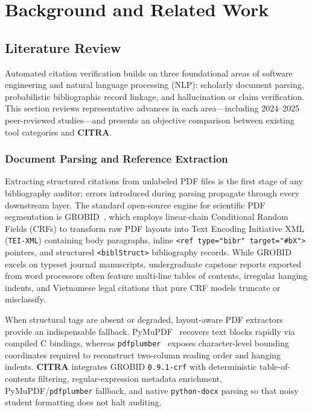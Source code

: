 \chapter{Background and Related Work}
\label{chap:background}

\section{Literature Review}

Automated citation verification builds on three foundational areas of software engineering and natural language processing (NLP): scholarly document parsing, probabilistic bibliographic record linkage, and hallucination or claim verification. This section reviews representative advances in each area---including 2024--2025 peer-reviewed studies---and presents an objective comparison between existing tool categories and \textbf{CITRA}.

\subsection{Document Parsing and Reference Extraction}

Extracting structured citations from unlabeled PDF files is the first stage of any bibliography auditor; errors introduced during parsing propagate through every downstream layer. The standard open-source engine for scientific PDF segmentation is GROBID~\cite{Lopez2009}, which employs linear-chain Conditional Random Fields (CRFs) to transform raw PDF layouts into Text Encoding Initiative XML (\texttt{TEI-XML}) containing body paragraphs, inline \texttt{<ref type="bibr" target="\#bX">} pointers, and structured \texttt{<biblStruct>} bibliography records. While GROBID excels on typeset journal manuscripts, undergraduate capstone reports exported from word processors often feature multi-line tables of contents, irregular hanging indents, and Vietnamese legal citations that pure CRF models truncate or misclassify.

When structural tags are absent or degraded, layout-aware PDF extractors provide an indispensable fallback. PyMuPDF~\cite{PyMuPDF2024} recovers text blocks rapidly via compiled C bindings, whereas \texttt{pdfplumber}~\cite{Pdfplumber2024} exposes character-level bounding coordinates required to reconstruct two-column reading order and hanging indents. \textbf{CITRA} integrates GROBID \texttt{0.9.1-crf} with deterministic table-of-contents filtering, regular-expression metadata enrichment, PyMuPDF/\texttt{pdfplumber} fallback, and native \texttt{python-docx} parsing so that noisy student formatting does not halt auditing.

